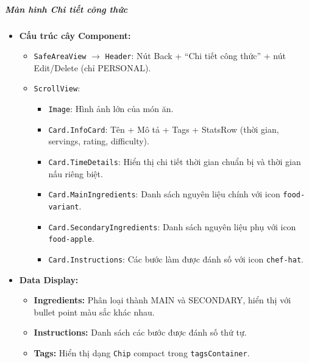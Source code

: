 \subparagraph{Màn hình Chi tiết công thức}
\begin{itemize}
    \item \textbf{Cấu trúc cây Component:}
        \begin{itemize}
            \item \texttt{SafeAreaView} $\rightarrow$ \texttt{Header}: Nút Back + ``Chi tiết công thức'' + nút Edit/Delete (chỉ PERSONAL).
            \item \texttt{ScrollView}:
                \begin{itemize}
                    \item \texttt{Image}: Hình ảnh lớn của món ăn.
                    \item \texttt{Card.InfoCard}: Tên + Mô tả + Tags + StatsRow (thời gian, servings, rating, difficulty).
                    \item \texttt{Card.TimeDetails}: Hiển thị chi tiết thời gian chuẩn bị và thời gian nấu riêng biệt.
                    \item \texttt{Card.MainIngredients}: Danh sách nguyên liệu chính với icon \texttt{food-variant}.
                    \item \texttt{Card.SecondaryIngredients}: Danh sách nguyên liệu phụ với icon \texttt{food-apple}.
                    \item \texttt{Card.Instructions}: Các bước làm được đánh số với icon \texttt{chef-hat}.
                \end{itemize}
        \end{itemize}
    \item \textbf{Data Display:}
        \begin{itemize}
            \item \textbf{Ingredients:} Phân loại thành MAIN và SECONDARY, hiển thị với bullet point màu sắc khác nhau.
            \item \textbf{Instructions:} Danh sách các bước được đánh số thứ tự.
            \item \textbf{Tags:} Hiển thị dạng \texttt{Chip} compact trong \texttt{tagsContainer}.
        \end{itemize}
\end{itemize}

